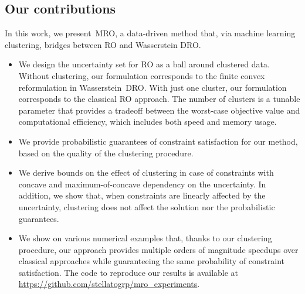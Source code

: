 \documentclass[12pt]{article}
\newcommand{\citep}{\cite}
\theoremstyle{thmstyleone}%
\theoremstyle{thmstyletwo}%
\theoremstyle{thmstylethree}%
\newcommand{\reviewChanges}{}
\begin{document}






\subsection{Our contributions}%
\label{sub:our_contributions}
In this work, we present~\gls{MRO}, a data-driven method that, via machine learning clustering, bridges between \gls{RO} and  Wasserstein \gls{DRO}.
\begin{itemize}
	\item We design the uncertainty set for \gls{RO} as a ball around clustered data. Without clustering, our formulation corresponds to the finite convex reformulation in Wasserstein~\gls{DRO}.
With just one cluster, our formulation corresponds to the classical \gls{RO} approach.
The number of clusters is a tunable parameter that provides a tradeoff between the worst-case objective value and computational efficiency, which includes both speed and memory usage.
	\item We provide probabilistic guarantees of constraint satisfaction for our method, based on the quality of the clustering procedure.
	\item We derive bounds on the effect of clustering in case of constraints with concave \reviewChanges{and maximum-of-concave} dependency on the uncertainty. In addition, we show that, when constraints are linearly affected by the uncertainty, clustering does not affect the solution nor the probabilistic guarantees.
	\item We show on various numerical examples that, thanks to our clustering procedure, our approach provides multiple orders of magnitude speedups over classical approaches while guaranteeing the same probability of constraint satisfaction. The code to reproduce our results is available at \url{https://github.com/stellatogrp/mro_experiments}.
\end{itemize}
\end{document}
